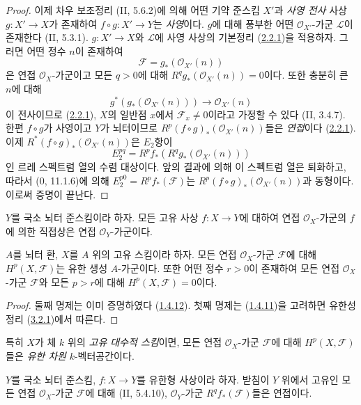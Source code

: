 \begin{proof}
이제 차우 보조정리 (II, 5.6.2)에 의해 어떤 기약 준스킴 $X'$과
\emph{사영 전사} 사상 $g:X'\to X$가 존재하여
$f\circ g:X'\to Y$는 \emph{사영}이다. $g$에 대해 풍부한 어떤
$\mathcal O_{X'}$-가군 $\mathcal L$이 존재한다 (II, 5.3.1).
$g:X'\to X$와 $\mathcal L$에 사영 사상의 기본정리
(\hyperref[III.2.2.1-fr]{2.2.1})을 적용하자. 그러면 어떤 정수 $n$이
존재하여
\[
\mathcal F=g_*(\mathcal O_{X'}(n))
\]
은 연접 $\mathcal O_X$-가군이고 모든 $q>0$에 대해
$R^qg_*(\mathcal O_{X'}(n))=0$이다. 또한 충분히 큰 $n$에 대해
\[
g^*(g_*(\mathcal O_{X'}(n)))\longrightarrow\mathcal O_{X'}(n)
\]
이 전사이므로 (\hyperref[III.2.2.1-fr]{2.2.1}), $X$의 일반점 $x$에서
$\mathcal F_x\neq0$이라고 가정할 수 있다 (II, 3.4.7). 한편
$f\circ g$가 사영이고 $Y$가 뇌터이므로
$R^p(f\circ g)_*(\mathcal O_{X'}(n))$들은 \emph{연접}이다
(\hyperref[III.2.2.1-fr]{2.2.1}). 이제
$R^*(f\circ g)_*(\mathcal O_{X'}(n))$은 $E_2$항이
\[
E_2^{pq}=R^pf_*(R^qg_*(\mathcal O_{X'}(n)))
\]
인 르레 스펙트럼 열의 수렴 대상이다. 앞의 결과에 의해 이 스펙트럼
열은 퇴화하고, 따라서 (0, 11.1.6)에 의해
$E_2^{p0}=R^pf_*(\mathcal F)$는
$R^p(f\circ g)_*(\mathcal O_{X'}(n))$과 동형이다. 이로써 증명이
끝난다.
\end{proof}

\begin{corollary}[3.2.2]
\label{III.3.2.2-fr}
$Y$를 국소 뇌터 준스킴이라 하자. 모든 고유 사상 $f:X\to Y$에
대하여 연접 $\mathcal O_X$-가군의 $f$에 의한 직접상은 연접
$\mathcal O_Y$-가군이다.
\end{corollary}

\begin{corollary}[3.2.3]
\label{III.3.2.3-fr}
$A$를 뇌터 환, $X$를 $A$ 위의 고유 스킴이라 하자. 모든 연접
$\mathcal O_X$-가군 $\mathcal F$에 대해 $H^p(X,\mathcal F)$는 유한
생성 $A$-가군이다. 또한 어떤 정수 $r>0$이 존재하여 모든 연접
$\mathcal O_X$-가군 $\mathcal F$와 모든 $p>r$에 대해
$H^p(X,\mathcal F)=0$이다.
\end{corollary}

\begin{proof}
둘째 명제는 이미 증명하였다
(\hyperref[III.1.4.12-fr]{1.4.12}). 첫째 명제는
(\hyperref[III.1.4.11-fr]{1.4.11})을 고려하면 유한성 정리
(\hyperref[III.3.2.1-fr]{3.2.1})에서 따른다.
\end{proof}

특히 $X$가 체 $k$ 위의 \emph{고유 대수적 스킴}이면, 모든 연접
$\mathcal O_X$-가군 $\mathcal F$에 대해 $H^p(X,\mathcal F)$들은
\emph{유한 차원} $k$-벡터공간이다.

\begin{corollary}[3.2.4]
\label{III.3.2.4-fr}
$Y$를 국소 뇌터 준스킴, $f:X\to Y$를 유한형 사상이라 하자. 받침이
$Y$ 위에서 고유인 모든 연접 $\mathcal O_X$-가군 $\mathcal F$에 대해
(II, 5.4.10), $\mathcal O_Y$-가군 $R^qf_*(\mathcal F)$들은 연접이다.
\end{corollary}

